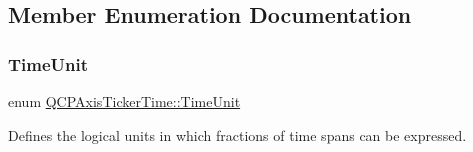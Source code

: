 \subsection{Member Enumeration Documentation}
\mbox{\label{class_q_c_p_axis_ticker_time_a5c48ded8c6d3a1aca9b68219469fea3e}} 
\subsubsection{\texorpdfstring{Time\+Unit}{TimeUnit}}
{\footnotesize\ttfamily enum \hyperlink{class_q_c_p_axis_ticker_time_a5c48ded8c6d3a1aca9b68219469fea3e}{Q\+C\+P\+Axis\+Ticker\+Time\+::\+Time\+Unit}}

Defines the logical units in which fractions of time spans can be expressed.

